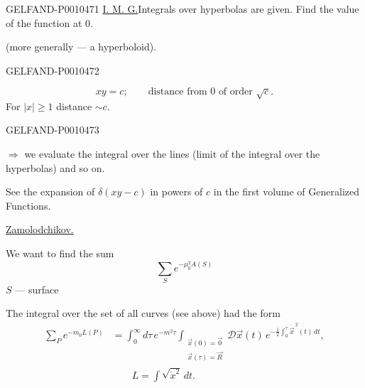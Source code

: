 \begin{GelfandAdjacentEvidence}{GELFAND-P001047}{1}
\underline{I. M. G.}\quad Integrals over hyperbolas are given. Find the value of the function at $0$.

(more generally — a hyperboloid).

\end{GelfandAdjacentEvidence}
\begin{GelfandAdjacentEvidence}{GELFAND-P001047}{2}

\[
xy=c;\qquad\text{distance from }0\text{ of order }\sqrt c.
\]
For $|x|\geqslant1$ distance $\sim c$.
\end{GelfandAdjacentEvidence}
\begin{GelfandAdjacentEvidence}{GELFAND-P001047}{3}


$\Rightarrow$ we evaluate the integral over the lines (limit of the integral over the hyperbolas) and so on.

See the expansion of $\delta(xy-c)$ in powers of $c$ in the first volume of Generalized Functions.

\medskip
\underline{Zamolodchikov.}

We want to find the sum
\begin{equation*}
\sum_S e^{-\mu_0^2 A(S)}
\tag{1}
\end{equation*}
$S$ — surface

The integral over the set of all curves (see above) had the form
\begin{equation*}
\begin{aligned}
\sum_P e^{-m_0L(P)}
&=\int_0^\infty d\tau\,e^{-m^2\tau}
\int_{\substack{\vec x(0)=\vec 0\\\vec x(\tau)=\vec R}}
\mathcal D\vec x(t)\,e^{-\frac12\int_0^\tau\dot{\vec x}^{\,2}(t)\,dt},\\
&\hspace{2em}L=\int\sqrt{\dot x^{2}}\,dt.
\end{aligned}
\tag{2}
\end{equation*}
\end{GelfandAdjacentEvidence}
